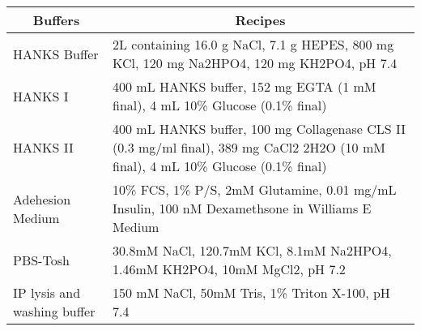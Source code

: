 \setlongtables\begin{longtable}{ll}\hline\hline
\multicolumn{1}{c}{Buffers}&\multicolumn{1}{c}{Recipes}\tabularnewline
\hline
\endhead
\hline
\endfoot
HANKS Buffer&2L containing 16.0 g NaCl, 7.1 g HEPES, 800 mg KCl, 120 mg Na2HPO4, 120 mg KH2PO4, pH 7.4\tabularnewline
HANKS I&400 mL HANKS buffer, 152 mg EGTA (1 mM final), 4 mL 10\% Glucose (0.1\% final)\tabularnewline
HANKS II&400 mL HANKS buffer, 100 mg Collagenase CLS II (0.3 mg/ml final), 389 mg CaCl2 2H2O (10 mM final), 4 mL 10\% Glucose (0.1\% final)\tabularnewline
Adehesion Medium&10\% FCS, 1\% P/S, 2mM Glutamine, 0.01 mg/mL Insulin, 100 nM Dexamethsone in Williams E Medium \tabularnewline
PBS-Tosh&30.8mM NaCl, 120.7mM KCl, 8.1mM Na2HPO4, 1.46mM KH2PO4, 10mM MgCl2, pH 7.2\tabularnewline
IP lysis and washing buffer&150 mM NaCl, 50mM Tris, 1\% Triton X-100, pH 7.4\tabularnewline
\hline
\end{longtable}
